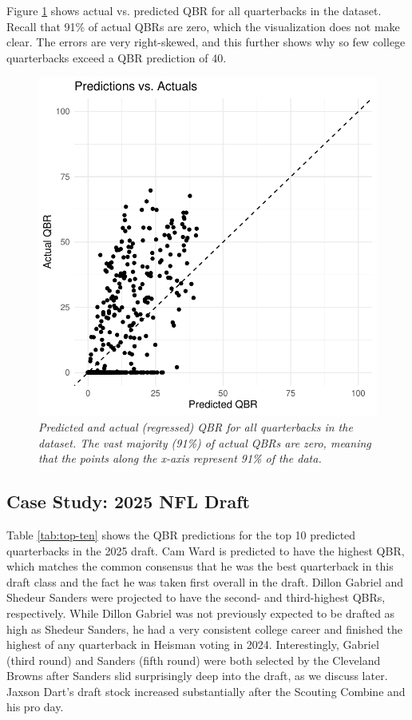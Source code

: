 \documentclass[Review, sageh, times]{sagej}
\begin{document}
Figure \ref{fig:predicted-vs-actuals} shows actual vs. predicted QBR for all quarterbacks in the dataset. Recall that 91\% of actual QBRs are zero, which the visualization does not make clear. The errors are very right-skewed, and this further shows why so few college quarterbacks exceed a QBR prediction of 40.

\begin{figure}[h]
  \centering
  \includegraphics[width=0.7\linewidth]{predicted_vs_actuals.pdf}
  \caption{\it Predicted and actual (regressed) QBR for all quarterbacks in the dataset. The vast majority (91\%) of actual QBRs are zero, meaning that the points along the x-axis represent 91\% of the data.}
  \label{fig:predicted-vs-actuals}
\end{figure}

\subsection{Case Study: 2025 NFL Draft}

Table \ref{tab:top-ten} shows the QBR predictions for the top 10 predicted quarterbacks in the 2025 draft. Cam Ward is predicted to have the highest QBR, which matches the common consensus that he was the best quarterback in this draft class and the fact he was taken first overall in the draft. Dillon Gabriel and Shedeur Sanders were projected to have the second- and third-highest QBRs, respectively. While Dillon Gabriel was not previously expected to be drafted as high as Shedeur Sanders, he had a very consistent college career and finished the highest of any quarterback in Heisman voting in 2024. Interestingly, Gabriel (third round) and Sanders (fifth round) were both selected by the Cleveland Browns after Sanders slid surprisingly deep into the draft, as we discuss later. Jaxson Dart's draft stock increased substantially after the Scouting Combine and his pro day.
\end{document}
